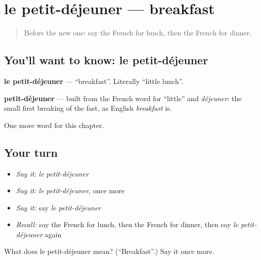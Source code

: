 \section[le petit-déjeuner]{le petit-déjeuner — breakfast}

\label{lesson:FR-C70-petit-dejeuner}



\begin{quote}
Before the new one: say the French for lunch, then the French for dinner.
\end{quote}

\subsection*{You'll want to know: le petit-déjeuner}
\textbf{le petit-déjeuner} — \textquotedblleft{}breakfast\textquotedblright{}. Literally \textquotedblleft{}little lunch\textquotedblright{}.

\begin{cousinweb}
\textbf{petit-déjeuner} — built from the French word for \textquotedblleft{}little\textquotedblright{} and \emph{déjeuner}: the small first breaking of the fast, as English \emph{breakfast} is.
\end{cousinweb}

\begin{grammarlens}[title={What you've built}]
One more word for this chapter.
\end{grammarlens}

\subsection*{Your turn}
\begin{itemize}
\raggedright
  \item \emph{Say it:} \emph{le petit-déjeuner}
  \item \emph{Say it:} \emph{le petit-déjeuner}, once more
  \item \emph{Say it:} say \emph{le petit-déjeuner}
  \item \emph{Recall:} say the French for lunch, then the French for dinner, then say \emph{le petit-déjeuner} again
\end{itemize}

\begin{tcolorbox}[breakable,colback=teal!4,colframe=teal!35!black,title={Before you move on}]
What does le petit-déjeuner mean? (\textquotedblleft{}Breakfast\textquotedblright{}.) Say it once more.
\end{tcolorbox}
